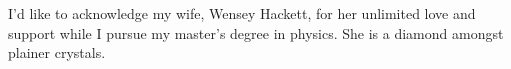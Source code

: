 \begin{acknowledgments}
    I'd like to acknowledge my wife, Wensey Hackett, for her unlimited love and support while I pursue my master's degree in physics. She is a diamond amongst plainer crystals.
    \end{acknowledgments}